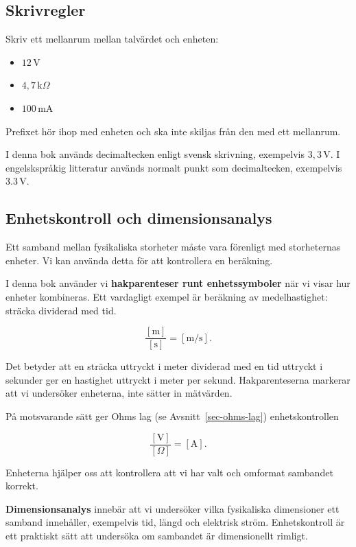 \documentclass[
  swedish,
  11pt,
  a4paper,
  DIV=11,
  numbers=noendperiod,
  twoside,
  open=any]{scrreprt}
\begin{document}
\subsection{Skrivregler}\label{sec-grunder-skrivregler}

Skriv ett mellanrum mellan talvärdet och enheten:

\begin{itemize}
\item
  \(12\,\mathrm{V}\)
\item
  \(4{,}7\,\mathrm{k}\Omega\)
\item
  \(100\,\mathrm{mA}\)
\end{itemize}

Prefixet hör ihop med enheten och ska inte skiljas från den med ett
mellanrum.

I denna bok används decimaltecken enligt svensk skrivning, exempelvis
\(3{,}3\,\mathrm{V}\). I engelskspråkig litteratur används normalt punkt
som decimaltecken, exempelvis \(3.3\,\mathrm{V}\).

\subsection{Enhetskontroll och
dimensionsanalys}\label{sec-grunder-enhetskontroll-och-dimensionsanalys}

Ett samband mellan fysikaliska storheter måste vara förenligt med
storheternas enheter. Vi kan använda detta för att kontrollera en
beräkning.

I denna bok använder vi \textbf{hakparenteser runt enhetssymboler} när
vi visar hur enheter kombineras. Ett vardagligt exempel är beräkning av
medelhastighet: sträcka dividerad med tid.

\[
\frac{[\mathrm{m}]}{[\mathrm{s}]} = [\mathrm{m/s}].
\]

Det betyder att en sträcka uttryckt i meter dividerad med en tid
uttryckt i sekunder ger en hastighet uttryckt i meter per sekund.
Hakparenteserna markerar att vi undersöker enheterna, inte sätter in
mätvärden.

På motsvarande sätt ger Ohms lag (se Avsnitt~\ref{sec-ohms-lag})
enhetskontrollen

\[
\frac{[\mathrm{V}]}{[\Omega]} = [\mathrm{A}].
\]

Enheterna hjälper oss att kontrollera att vi har valt och omformat
sambandet korrekt.

\textbf{Dimensionsanalys} innebär att vi undersöker vilka fysikaliska
dimensioner ett samband innehåller, exempelvis tid, längd och elektrisk
ström. Enhetskontroll är ett praktiskt sätt att undersöka om sambandet
är dimensionellt rimligt.
\end{document}
